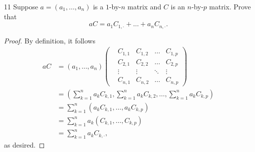 \documentclass[11pt]{extarticle}
\newenvironment{problem}[1]{\begin{prob*}{#1}{}}{\end{prob*}}
\begin{document}
\begin{problem}{11}
Suppose $a = (a_1, \dots, a_n)$ is a $1$-by-$n$ matrix and $C$ is an $n$-by-$p$ matrix.  Prove that
\begin{equation*}
aC = a_1C_{1,\cdot} + \dots + a_nC_{n,\cdot}.
\end{equation*}
\end{problem}
\begin{proof}
By definition, it follows
\begin{align*}
aC &= (a_1, \dots, a_n)\begin{pmatrix}
		&C_{1,1} &C_{1,2}    &\dots    &C_{1, p} \\ 
		&C_{2,1} &C_{2,2}    &\dots    &C_{2, p} \\
		&\vdots   &\vdots      & \ddots &\vdots \\ 
		&C_{n,1} &C_{n, 2} &\dots    &C_{n,p}\end{pmatrix}\\
&= \left(\sum_{k = 1}^n a_k C_{k, 1}, \sum_{k = 1}^n a_k C_{k, 2}, \dots, \sum_{k = 1}^n a_k C_{k, p}  \right)\\
&= \sum_{k = 1}^n\left(a_kC_{k,1}, \dots, a_kC_{k, p}\right)\\
&= \sum_{k = 1}^na_k\left(C_{k,1}, \dots, C_{k, p}\right)\\
&= \sum_{k = 1}^na_kC_{k, \cdot},
\end{align*}
as desired.
\end{proof}
\end{document}
